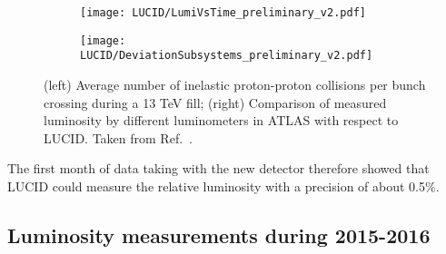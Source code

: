 \begin{figure}
\centering
\begin{subfigure}{.5\textwidth}
  \centering
  \texttt{[image: LUCID/LumiVsTime\_preliminary\_v2.pdf]}
  \label{fig:sub3}
\end{subfigure}%
\begin{subfigure}{.5\textwidth}
  \centering
  \texttt{[image: LUCID/DeviationSubsystems\_preliminary\_v2.pdf]}
  \label{fig:sub4}
\end{subfigure}
\caption{(left) Average number of inelastic proton-proton collisions per bunch crossing during a 13 TeV fill; 
(right) Comparison of measured luminosity by different luminometers in ATLAS with respect to LUCID. Taken from Ref.~\cite{publicPlots}.}
\label{fig:LumiVsTime}
\end{figure}

The first month of data taking with the new detector therefore showed that LUCID could measure the relative 
luminosity with a precision of about 0.5$\%$.


\subsection{Luminosity measurements during 2015-2016}



